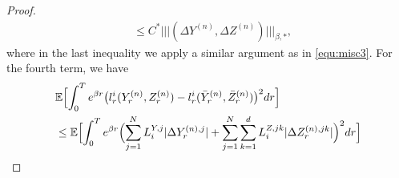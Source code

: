\documentclass[10pt,a4paper]{article}
\theoremstyle{plain}
\theoremstyle{definition}
\numberwithin{equation}{section}
\newcommand{\trinm}[1]{\vert\!\vert\!\vert #1 \vert\!\vert\!\vert}
\begin{document}
\begin{proof}
\begin{align}
&\leq C^{*}\trinm{(\Delta Y^{(n)},\Delta Z^{(n)})}_{\beta,*}, \label{equ:stab8}
\end{align}
where in the last inequality we apply a similar argument as in \eqref{equ:misc3}.
For the fourth term, we have
\begin{align}
&\mathbb{E}\Bigl[\int_{0}^{T}e^{\beta r}\bigl(l_{r}^{i}(Y_{r}^{(n)},Z_{r}^{(n)})-l_{r}^{i}(\bar{Y}_{r}^{(n)},\bar{Z}_{r}^{(n)})\bigr)^{2}dr\Bigr] \nonumber \\
&\leq \mathbb{E}\Bigl[\int_{0}^{T}e^{\beta r}\Bigl(\sum_{j=1}^{N}L_{i}^{Y,j}|\Delta Y_{r}^{(n),j}| + \sum_{j=1}^{N}\sum_{k=1}^{d}L_{i}^{Z,jk}|\Delta Z_{r}^{(n),jk}|\Bigr)^{2}dr\Bigr] \nonumber \\

\end{align}
\end{proof}
\end{document}
